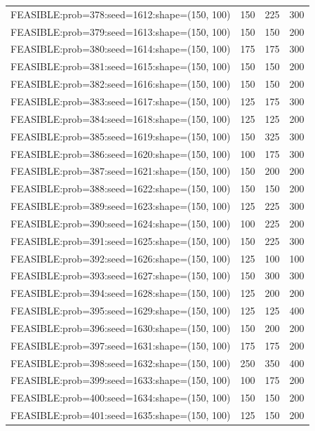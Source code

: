 \begin{longtable}{lccc}
FEASIBLE:prob=378:seed=1612:shape=(150, 100) &  150 &   225 &    300 \\
FEASIBLE:prob=379:seed=1613:shape=(150, 100) &  150 &   150 &    200 \\
FEASIBLE:prob=380:seed=1614:shape=(150, 100) &  175 &   175 &    300 \\
FEASIBLE:prob=381:seed=1615:shape=(150, 100) &  150 &   150 &    200 \\
FEASIBLE:prob=382:seed=1616:shape=(150, 100) &  150 &   150 &    200 \\
FEASIBLE:prob=383:seed=1617:shape=(150, 100) &  125 &   175 &    300 \\
FEASIBLE:prob=384:seed=1618:shape=(150, 100) &  125 &   125 &    200 \\
FEASIBLE:prob=385:seed=1619:shape=(150, 100) &  150 &   325 &    300 \\
FEASIBLE:prob=386:seed=1620:shape=(150, 100) &  100 &   175 &    300 \\
FEASIBLE:prob=387:seed=1621:shape=(150, 100) &  150 &   200 &    200 \\
FEASIBLE:prob=388:seed=1622:shape=(150, 100) &  150 &   150 &    200 \\
FEASIBLE:prob=389:seed=1623:shape=(150, 100) &  125 &   225 &    300 \\
FEASIBLE:prob=390:seed=1624:shape=(150, 100) &  100 &   225 &    200 \\
FEASIBLE:prob=391:seed=1625:shape=(150, 100) &  150 &   225 &    300 \\
FEASIBLE:prob=392:seed=1626:shape=(150, 100) &  125 &   100 &    100 \\
FEASIBLE:prob=393:seed=1627:shape=(150, 100) &  150 &   300 &    300 \\
FEASIBLE:prob=394:seed=1628:shape=(150, 100) &  125 &   200 &    200 \\
FEASIBLE:prob=395:seed=1629:shape=(150, 100) &  125 &   125 &    400 \\
FEASIBLE:prob=396:seed=1630:shape=(150, 100) &  150 &   200 &    200 \\
FEASIBLE:prob=397:seed=1631:shape=(150, 100) &  175 &   175 &    200 \\
FEASIBLE:prob=398:seed=1632:shape=(150, 100) &  250 &   350 &    400 \\
FEASIBLE:prob=399:seed=1633:shape=(150, 100) &  100 &   175 &    200 \\
FEASIBLE:prob=400:seed=1634:shape=(150, 100) &  150 &   150 &    200 \\
FEASIBLE:prob=401:seed=1635:shape=(150, 100) &  125 &   150 &    200 \\

\end{longtable}

